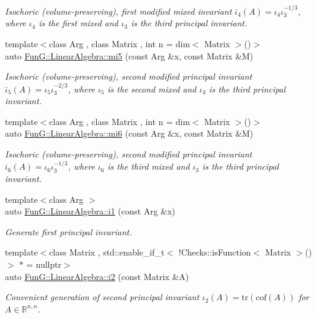 \begin{DoxyCompactItemize}
\begin{DoxyCompactList}\small\item\em Isochoric (volume-\/preserving), first modified mixed invariant $ \bar\iota_4(A)=\iota_4\iota_3^{-1/3} $, where $\iota_4$ is the first mixed and $\iota_3$ is the third principal invariant. \end{DoxyCompactList}\item 
{\footnotesize template$<$class Arg , class Matrix , int n = dim$<$ Matrix $>$()$>$ }\\auto \hyperlink{group__InvariantGroup_ga189bc682b34d13902da335c5eb502faa}{Fun\-G\-::\-Linear\-Algebra\-::mi5} (const Arg \&x, const Matrix \&M)
\begin{DoxyCompactList}\small\item\em Isochoric (volume-\/preserving), second modified principal invariant $ \bar\iota_5(A)=\iota_5\iota_3^{-2/3} $, where $\iota_5$ is the second mixed and $\iota_3$ is the third principal invariant. \end{DoxyCompactList}\item 
{\footnotesize template$<$class Arg , class Matrix , int n = dim$<$ Matrix $>$()$>$ }\\auto \hyperlink{group__InvariantGroup_ga3e451f9e15fa95080f81d0c0f69f93e6}{Fun\-G\-::\-Linear\-Algebra\-::mi6} (const Arg \&x, const Matrix \&M)
\begin{DoxyCompactList}\small\item\em Isochoric (volume-\/preserving), second modified principal invariant $ \bar\iota_6(A)=\iota_6\iota_3^{-1/3} $, where $\iota_6$ is the third mixed and $\iota_3$ is the third principal invariant. \end{DoxyCompactList}\item 
{\footnotesize template$<$class Arg $>$ }\\auto \hyperlink{group__InvariantGroup_gafaead59b618d87239270f8eca2bf75c8}{Fun\-G\-::\-Linear\-Algebra\-::i1} (const Arg \&x)
\begin{DoxyCompactList}\small\item\em Generate first principal invariant. \end{DoxyCompactList}\item 
{\footnotesize template$<$class Matrix , std\-::enable\-\_\-if\-\_\-t$<$ !\-Checks\-::is\-Function$<$ Matrix $>$() $>$ $\ast$  = nullptr$>$ }\\auto \hyperlink{group__InvariantGroup_ga9e442bab8f203bcd5634a3d0e65bf802}{Fun\-G\-::\-Linear\-Algebra\-::i2} (const Matrix \&A)
\begin{DoxyCompactList}\small\item\em Convenient generation of second principal invariant $ \iota_2(A)=\mathrm{tr}(\mathrm{cof}(A)) $ for $A\in\mathbb{R}^{n,n}$. \end{DoxyCompactList}\item 

\end{DoxyCompactItemize}
